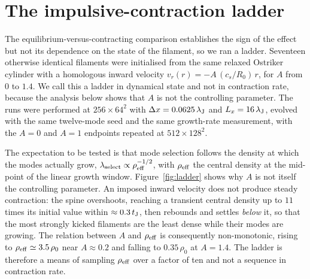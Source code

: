 \documentclass[usenatbib,twoside,twocolumn]{mnras}
\begin{document}
\section{The impulsive-contraction ladder}
\label{sec:ladder}


The equilibrium-versus-contracting comparison establishes the sign of the effect but not its dependence on the state of the filament, so we ran a ladder. Seventeen otherwise identical filaments were initialised from the same relaxed Ostriker cylinder with a homologous inward velocity $v_r(r)=-A\,(c_s/R_0)\,r$, for $A$ from $0$ to $1.4$. We call this a ladder in dynamical state and not in contraction rate, because the analysis below shows that $A$ is not the controlling parameter. The runs were performed at $256\times64^2$ with $\Delta x=0.0625\,\lambda_{\rm J}$ and $L_x=16\,\lambda_{\rm J}$, evolved with the same twelve-mode seed and the same growth-rate measurement, with the $A=0$ and $A=1$ endpoints repeated at $512\times128^2$.

The expectation to be tested is that mode selection follows the density at which the modes actually grow, $\lambda_{\rm select}\propto\rho_{\rm eff}^{-1/2}$, with $\rho_{\rm eff}$ the central density at the mid-point of the linear growth window. Figure~\ref{fig:ladder} shows why $A$ is not itself the controlling parameter. An imposed inward velocity does not produce steady contraction: the spine overshoots, reaching a transient central density up to $11$ times its initial value within $\approx0.3\,t_{\rm J}$, then rebounds and settles \emph{below} it, so that the most strongly kicked filaments are the least dense while their modes are growing. The relation between $A$ and $\rho_{\rm eff}$ is consequently non-monotonic, rising to $\rho_{\rm eff}\simeq3.5\,\rho_0$ near $A\approx0.2$ and falling to $0.35\,\rho_0$ at $A=1.4$. The ladder is therefore a means of sampling $\rho_{\rm eff}$ over a factor of ten and not a sequence in contraction rate.
\end{document}

